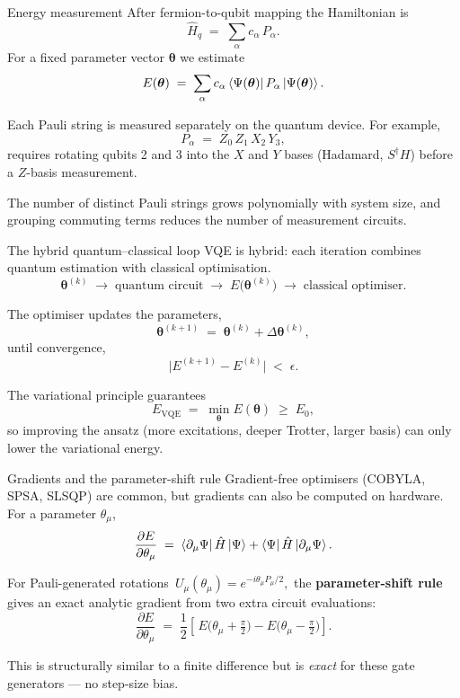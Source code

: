 \documentclass[10pt,aspectratio=169]{beamer}
\begin{document}
\begin{frame}{Energy measurement}
After fermion-to-qubit mapping the Hamiltonian is
\[
\hat H_q \;=\; \sum_\alpha c_\alpha\, P_\alpha.
\]
For a fixed parameter vector $\bm\theta$ we estimate
\[
E(\bm\theta)
\;=\;
\sum_\alpha c_\alpha \bra{\Psi(\bm\theta)} P_\alpha \ket{\Psi(\bm\theta)}.
\]

\medskip
Each Pauli string is measured separately on the quantum device. For example,
\[
P_\alpha \;=\; Z_0\, Z_1\, X_2\, Y_3,
\]
requires rotating qubits 2 and 3 into the $X$ and $Y$ bases (Hadamard, $S^\dagger H$) before a $Z$-basis measurement.

\medskip
The number of distinct Pauli strings grows polynomially with system size, and grouping commuting terms reduces the number of measurement circuits.
\end{frame}

\begin{frame}{The hybrid quantum--classical loop}
VQE is hybrid: each iteration combines quantum estimation with classical optimisation.
\[
\bm\theta^{(k)}
\;\longrightarrow\;
\text{quantum circuit}
\;\longrightarrow\;
E\big(\bm\theta^{(k)}\big)
\;\longrightarrow\;
\text{classical optimiser}.
\]

The optimiser updates the parameters,
\[
\bm\theta^{(k+1)} \;=\; \bm\theta^{(k)} + \Delta\bm\theta^{(k)},
\]
until convergence,
\[
\big|E^{(k+1)} - E^{(k)}\big| \;<\; \epsilon.
\]

\medskip
The variational principle guarantees
\[
E_{\mathrm{VQE}} \;=\; \min_{\bm\theta} E(\bm\theta) \;\geq\; E_0,
\]
so improving the ansatz (more excitations, deeper Trotter, larger basis) can only lower the variational energy.
\end{frame}

\begin{frame}{Gradients and the parameter-shift rule}
Gradient-free optimisers (COBYLA, SPSA, SLSQP) are common, but gradients can also be computed on hardware.
For a parameter $\theta_\mu$,
\[
\frac{\partial E}{\partial \theta_\mu}
\;=\;
\bra{\partial_\mu \Psi}\hat H\ket{\Psi} + \bra{\Psi}\hat H\ket{\partial_\mu \Psi}.
\]

For Pauli-generated rotations
\(\,U_\mu(\theta_\mu) = e^{-i\theta_\mu P_\mu/2},\)
the \textbf{parameter-shift rule} gives an exact analytic gradient from two extra circuit evaluations:
\[
\frac{\partial E}{\partial \theta_\mu}
\;=\;
\frac12\left[\,E\!\Big(\theta_\mu+\tfrac{\pi}{2}\Big) - E\!\Big(\theta_\mu-\tfrac{\pi}{2}\Big)\right].
\]

\medskip
This is structurally similar to a finite difference but is \emph{exact} for these gate generators --- no step-size bias.
\end{frame}
\end{document}
